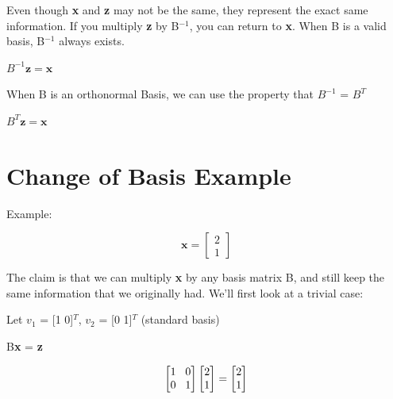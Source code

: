 \documentclass[11pt]{article}
\begin{document}
\vspace{4mm}

Even though \textbf{x} and \textbf{z} may not be the same, they represent the exact same information. If you multiply \textbf{z} by B$^{-1}$, you can return to \textbf{x}. When B is a valid basis, B$^{-1}$ always exists.

\begin{center}

$B^{-1} \textbf{z} = \textbf{x}$

\end{center}

\vspace{4mm}

When B is an orthonormal Basis, we can use the property that $B^{-1}$ = $B^T$

\begin{center}

$B^{T} \textbf{z} = \textbf{x}$

\end{center}

\newpage




\section*{Change of Basis Example}


Example:\newline

\begin{center}
\[
\textbf{x} = 
\begin{bmatrix}
   2        \\
    1            
\end{bmatrix}
\]
\end{center}

 
The claim is that we can multiply \textbf{x} by any basis matrix B, and still keep the same information that we originally had. We'll first look at a trivial case:\newline

Let $v_1$ = [1 0]$^T$, $v_2$ = [0 1]$^T$  (standard basis)

\vspace{3mm}
\begin{center}

B\textbf{x} = \textbf{z}

\end{center}

\[
\begin{bmatrix}
   1 \hspace{3mm} 0       \\
   0 \hspace{3mm} 1            
\end{bmatrix}
\begin{bmatrix}
    2  \\
    1
\end{bmatrix}
= 
\begin{bmatrix}
    2  \\
    1
\end{bmatrix}
\]
\end{document}
